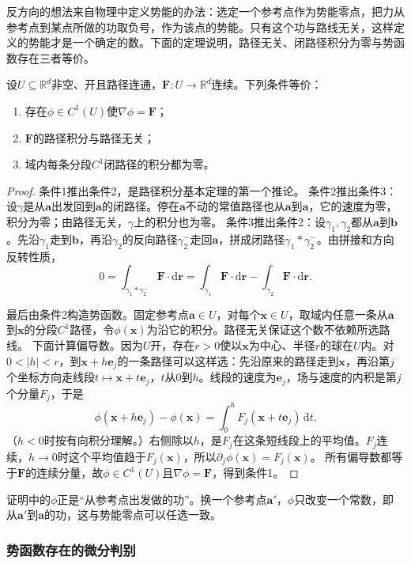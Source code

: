 反方向的想法来自物理中定义势能的办法：选定一个参考点作为势能零点，把力从参考点到某点所做的功取负号，作为该点的势能。只有这个功与路线无关，这样定义的势能才是一个确定的数。下面的定理说明，路径无关、闭路径积分为零与势函数存在三者等价。
\begin{theorem}[路径无关的等价条件]
设$U\subseteq\mathbb R^d$非空、开且路径连通，$\bm F:U\to\mathbb R^d$连续。下列条件等价：
\begin{enumerate}
 \item 存在$\phi\in C^1(U)$使$\nabla\phi=\bm F$；
 \item $\bm F$的路径积分与路径无关；
 \item 域内每条分段$C^1$闭路径的积分都为零。
\end{enumerate}
\end{theorem}
\begin{proof}
条件1推出条件2，是路径积分基本定理的第一个推论。
条件2推出条件3：设$\gamma$是从$\bm a$出发回到$\bm a$的闭路径。停在$\bm a$不动的常值路径也从$\bm a$到$\bm a$，它的速度为零，积分为零；由路径无关，$\gamma$上的积分也为零。
条件3推出条件2：设$\gamma_1,\gamma_2$都从$\bm a$到$\bm b$。先沿$\gamma_1$走到$\bm b$，再沿$\gamma_2$的反向路径$\gamma_2^-$走回$\bm a$，拼成闭路径$\gamma_1*\gamma_2^-$。由拼接和方向反转性质，
\[
 0=\int_{\gamma_1*\gamma_2^-}\bm F\cdot\mathrm d\bm r
 =\int_{\gamma_1}\bm F\cdot\mathrm d\bm r-\int_{\gamma_2}\bm F\cdot\mathrm d\bm r.
\]

最后由条件2构造势函数。固定参考点$\bm a\in U$，对每个$\bm x\in U$，取域内任意一条从$\bm a$到$\bm x$的分段$C^1$路径，令$\phi(\bm x)$为沿它的积分。路径无关保证这个数不依赖所选路线。
下面计算偏导数。因为$U$开，存在$r>0$使以$\bm x$为中心、半径$r$的球在$U$内。对$0<|h|<r$，到$\bm x+h\bm e_j$的一条路径可以这样选：先沿原来的路径走到$\bm x$，再沿第$j$个坐标方向走线段$t\mapsto\bm x+t\bm e_j$，$t$从$0$到$h$。线段的速度为$\bm e_j$，场与速度的内积是第$j$个分量$F_j$，于是
\[
 \phi(\bm x+h\bm e_j)-\phi(\bm x)
 =\int_0^h F_j(\bm x+t\bm e_j)\,\mathrm dt.
\]
（$h<0$时按有向积分理解。）右侧除以$h$，是$F_j$在这条短线段上的平均值。$F_j$连续，$h\to0$时这个平均值趋于$F_j(\bm x)$，所以$\partial_j\phi(\bm x)=F_j(\bm x)$。
所有偏导数都等于$\bm F$的连续分量，故$\phi\in C^1(U)$且$\nabla\phi=\bm F$，得到条件1。
\end{proof}

证明中的$\phi$正是“从参考点出发做的功”。换一个参考点$\bm a'$，$\phi$只改变一个常数，即从$\bm a'$到$\bm a$的功，这与势能零点可以任选一致。

\subsubsection{势函数存在的微分判别}

